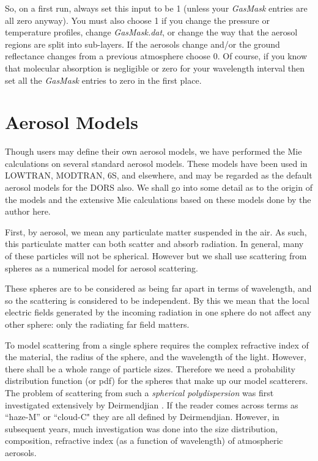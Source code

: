 \documentclass[12pt]{article}
\begin{document}
So, on  a first run, always set this input to be 1 (unless your {\it GasMask} entries are all zero anyway).
 You must also choose 1 if you change the pressure or
temperature profiles, change {\it GasMask.dat}, or change the way that the aerosol regions are
split into sub-layers. If the aerosols change and/or the ground reflectance changes from a previous atmosphere
 choose 0. Of course, if you know that molecular absorption is negligible
 or zero for your wavelength interval then set all the {\it GasMask} entries to zero in the first place.

\section{Aerosol Models}

Though users may define their own aerosol models, we have performed the Mie calculations on several standard 
aerosol models. These models have been used in LOWTRAN,  MODTRAN, 6S, and elsewhere, and may be regarded as
 the default aerosol models for the DORS also. We shall go into some detail as to the origin of the 
models and the extensive
 Mie calculations based on these models done by the author here.

First, by aerosol, we mean any particulate matter suspended in the air. As such, this particulate matter can
both scatter and absorb radiation. In general, many of these particles will not be spherical. 
However but we  shall use scattering from spheres as 
a numerical model for aerosol scattering. 

These spheres are to be 
considered as being far apart in terms of wavelength, and so the scattering is considered to be independent. By
this we mean that the local electric fields generated by the incoming radiation in one sphere do not affect
any other sphere: only the radiating far field matters.

To model scattering from a single sphere requires the complex refractive index of the material, the radius of
the sphere, and the wavelength of the light. However, there shall be a whole range of particle sizes. Therefore
we need a probability distribution function (or pdf) for the spheres that make up our model scatterers.
The problem of scattering from such a {\it spherical polydispersion} was first investigated extensively
by Deirmendjian \cite{Deirmendjian:Mybib}. If the reader comes across terms as ``haze-M'' or ``cloud-C" they are all defined by
Deirmendjian. However, in subsequent years, much investigation was done into the size distribution, composition, 
 refractive index (as a function of wavelength) of atmospheric aerosols.
\end{document}
